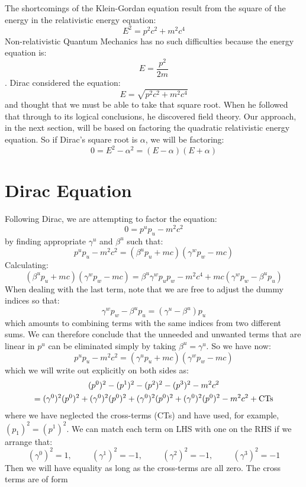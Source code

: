 \documentclass[12pt]{book}
\begin{document}
The shortcomings of the Klein-Gordan equation result from the square of the energy in the relativistic energy equation:
$$E^2 = p^2c^2 + m^2c^4$$
Non-relativistic Quantum Mechanics has no such difficulties because the energy equation is:
$$E = \frac{p^2}{2m}$$.
Dirac considered the equation:
$$E = \sqrt{p^2c^2 + m^2c^4}$$
and thought that we must be able to take that square root.  When he followed that through to its logical conclusions, he discovered field theory.  Our approach, in the next section, will be based on factoring the quadratic relativistic energy equation.  So if Dirac's square root is $\alpha$, we will be factoring:
$$0 = E^2 - \alpha^2 = (E-\alpha)(E+\alpha)$$

\section{Dirac Equation}
Following Dirac, we are attempting to factor the equation:
$$0 = p^u p_u - m^2 c^2$$
by finding appropriate $\gamma^u$ and $\beta^u$ such that:
$$p^u p_u - m^2 c^2 = (\beta^u p_u + mc) (\gamma^w p_w - mc)$$
Calculating:
$$(\beta^u p_u + mc) (\gamma^w p_w - mc) 
= \beta^u \gamma^w p_u p_w - m^2c^4 + mc (\gamma^w p_w - \beta^u p_u)$$
When dealing with the last term, note that we are free to adjust the dummy indices so that:
$$\gamma^w p_w - \beta^u p_u = (\gamma^u - \beta^u) p_u$$
which amounts to combining terms with the same indices from two different sums.  We can therefore conclude that the unneeded and unwanted terms that are linear in $p^u$ can be eliminated simply by taking $\beta^u = \gamma^u$.  So we have now:
$$p^u p_u - m^2 c^2 = (\gamma^u p_u + mc) (\gamma^w p_w - mc)$$
which we will write out explicitly on both sides as:
\begin{multline*}
(p^0)^2-(p^1)^2-(p^2)^2-(p^3)^2-m^2c^2 \\
= (\gamma^0)^2 (p^0)^2 + (\gamma^0)^2 (p^0)^2 + (\gamma^0)^2 (p^0)^2 + (\gamma^0)^2 (p^0)^2
-m^2c^2 + {\rm CTs}
\end{multline*}
where we have neglected the cross-terms (CTs) and have used, for example, $(p_1)^2=(p^1)^2$.  We can match each term on LHS with one on the RHS if we arrange that:
\begin{equation}
\label{eqn:gammasq}
(\gamma^0)^2=1, \hspace{1cm} (\gamma^1)^2=-1,  \hspace{1cm} (\gamma^2)^2=-1,
 \hspace{1cm} (\gamma^3)^2=-1
\end{equation}
Then we will have equality as long as the cross-terms are all zero.  The cross terms are of form
\end{document}
